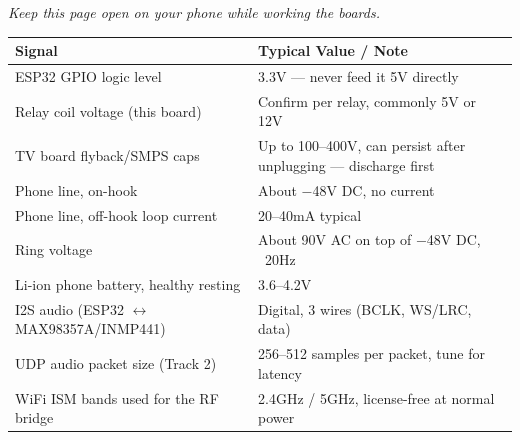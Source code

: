 \vspace{0.5cm}

{\small\itshape\color{arligray} Keep this page open on your phone while working the boards.}

\vspace{0.2cm}
\noindent
\begin{tabular}{@{}p{5cm} p{6.5cm}@{}}
\toprule
\textbf{\color{arliznavy}Signal} & \textbf{\color{arlizblue}Typical Value / Note} \\
\midrule
ESP32 GPIO logic level & 3.3V --- never feed it 5V directly \\
Relay coil voltage (this board) & Confirm per relay, commonly 5V or 12V \\
TV board flyback/SMPS caps & Up to 100--400V, can persist after unplugging --- discharge first \\
Phone line, on-hook & About $-$48V DC, no current \\
Phone line, off-hook loop current & 20--40mA typical \\
Ring voltage & About 90V AC on top of $-$48V DC, ~20Hz \\
Li-ion phone battery, healthy resting & 3.6--4.2V \\
I2S audio (ESP32 $\leftrightarrow$ MAX98357A/INMP441) & Digital, 3 wires (BCLK, WS/LRC, data) \\
UDP audio packet size (Track 2) & 256--512 samples per packet, tune for latency \\
WiFi ISM bands used for the RF bridge & 2.4GHz / 5GHz, license-free at normal power \\
\bottomrule
\end{tabular}

